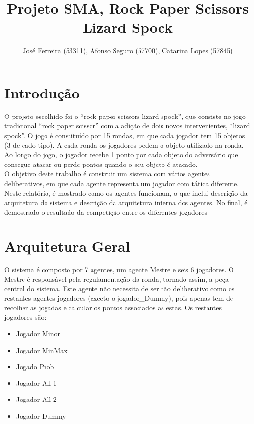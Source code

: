 \documentclass[12pt]{article}
\title{Projeto SMA, Rock Paper Scissors Lizard Spock}
\author{José Ferreira (53311), Afonso Seguro (57700), Catarina Lopes (57845)}
\begin{document}
	
	\maketitle
	
	\section*{Introdução}
    O projeto escolhido foi o “rock paper scissors lizard spock”, que consiste no jogo tradicional “rock paper scissor” com a adição de dois novos intervenientes, “lizard spock”. O jogo é constituído por 15 rondas, em que cada jogador tem 15 objetos (3 de cado tipo). A cada ronda os jogadores pedem o objeto utilizado na ronda. Ao longo do jogo, o jogador recebe 1 ponto por cada objeto do adversário que consegue atacar ou perde pontos quando o seu objeto é atacado.\\
    O objetivo deste trabalho é construir um sistema com vários agentes deliberativos, em que cada agente representa um jogador com tática diferente.\\
    Neste relatório, é mostrado como os agentes funcionam, o que inclui descrição da arquitetura do sistema e descrição da arquitetura interna dos agentes. No final, é demostrado o resultado da competição entre os diferentes jogadores.\\


	
	\section*{Arquitetura Geral}
    O sistema é composto por 7 agentes, um agente Mestre e seis 6 jogadores. O Mestre é responsável pela regulamentação da ronda, tornado assim, a peça central do sistema. Este agente não necessita de ser tão deliberativo como os restantes agentes jogadores (exceto o jogador\_Dummy), pois apenas tem de recolher as jogadas e calcular os pontos associados as estas. Os restantes jogadores são:
    
    \begin{itemize}
        \item Jogador Minor
        \item Jogador MinMax
        \item Jogado Prob
        \item Jogador All 1
        \item Jogador All 2
        \item Jogador Dummy
    \end{itemize}
    
\end{document}
